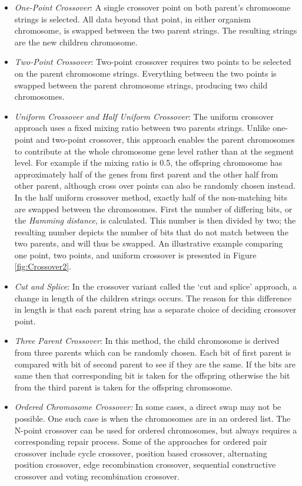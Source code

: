 \documentclass[journal]{IEEEtran}
\begin{document}
\begin{itemize}

\item \emph{One-Point Crossover}: A single crossover point on both parent's chromosome strings is selected. All data beyond that point, in either organism chromosome, is swapped between the two parent strings. The resulting strings are the new children chromosome. 

\item \emph{Two-Point Crossover}: Two-point crossover requires two points to be selected on the parent chromosome strings. Everything between the two points is swapped between the parent chromosome strings, producing two child chromosomes. 

\item \emph{Uniform Crossover and Half Uniform Crossover}: The uniform crossover approach uses a fixed mixing ratio between two parents strings. Unlike one-point and two-point crossover, this approach enables the parent chromosomes to contribute at the whole chromosome gene level rather than at the segment level. For example if the mixing ratio is 0.5, the offspring chromosome has approximately half of the genes from first parent and the other half from other parent, although cross over points can also be randomly chosen instead. In the half uniform crossover method, exactly half of the non-matching bits are swapped between the chromosomes. First the number of differing bits, or the \emph{Hamming distance}, is calculated. This number is then divided by two; the resulting number depicts the number of bits that do not match between the two parents, and will thus be swapped. An illustrative example comparing one point, two points, and uniform crossover is presented in Figure \ref{fig:Crossover2}. 

\item\emph{Cut and Splice}: In the crossover variant called the `cut and splice' approach,  a change in length of the children strings occurs. The reason for this difference in length is that each parent string has a separate choice of deciding crossover point.

\item \emph{Three Parent Crossover}: In this method, the child chromosome is derived from three parents which can be randomly chosen. Each bit of first parent is compared with bit of second parent to see if they are the same. If the bits are same then that corresponding bit is taken for the offspring otherwise the bit from the third parent is taken for the offspring chromosome. 

\item \emph{Ordered Chromosome Crossover:} In some cases, a direct swap may not be possible. One such case is when the chromosomes are in an ordered list. The N-point crossover can be used for ordered chromosomes, but always requires a corresponding repair process. Some of the approaches for ordered pair crossover include cycle crossover, position based crossover, alternating position crossover, edge recombination crossover, sequential constructive crossover and voting recombination crossover.

\end{itemize} 
\end{document}

